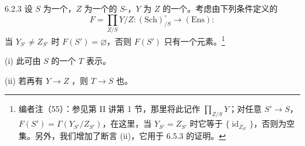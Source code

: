 \begin{SGAresult}{}{6.2.3}
设 $S$ 为一个，$Z$ 为一个的 $S$-，$Y$ 为 $Z$ 的一个。考虑由下列条件定义的
\[
F=\prod_{Z/S}Y/Z:(\mathrm{Sch})^\circ_{/S}\longrightarrow(\mathrm{Ens}):
\]
当 $Y_{S'}\ne Z_{S'}$ 时 $F(S')=\varnothing$，否则 $F(S')$ 只有一个元素。\footnote{编者注（55）：参见第 II 讲第 1 节，那里将此记作 $\prod_{Z/S}Y$；对任意 $S'\to S$，$F(S')=\Gamma(Y_{S'}/Z_{S'})$，在这里，当 $Y_{S'}=Z_{S'}$ 时它等于 $\{\operatorname{id}_{Z_{S'}}\}$，否则为空集。另外，我们增加了断言 (ii)，它用于 6.5.3 的证明。}

(i) 此可由 $S$ 的一个 $T$ 表示。

(ii) 若再有 $Y\to Z$ ，则 $T\to S$ 也。
\end{SGAresult}
